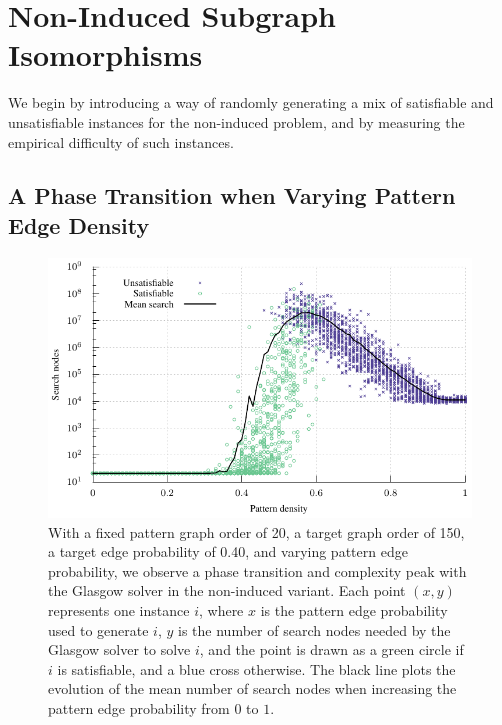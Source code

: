 \documentclass[twoside,11pt]{article}
\begin{document}
\section{Non-Induced Subgraph Isomorphisms}\label{section:non-induced}

We begin by introducing a way of randomly generating a mix of satisfiable and unsatisfiable
instances for the non-induced problem, and by measuring the empirical difficulty of such instances.

\subsection{A Phase Transition when Varying Pattern Edge Density}

\begin{figure}[t]
    \centering
    \includegraphics*{plots/phase-transition.pdf}

    \caption{With a fixed pattern graph order of 20, a target graph order of 150, a target edge
    probability of 0.40, and varying pattern edge probability, we observe a phase transition and
    complexity peak with the Glasgow solver in the non-induced variant. Each point $(x, y)$
    represents one instance $i$, where $x$ is the pattern edge probability used to generate $i$, $y$
    is the number of search nodes needed by the Glasgow solver to solve $i$, and the point is drawn
    as a green circle if $i$ is satisfiable, and a blue cross otherwise. The black line plots the
    evolution of the mean number of search nodes when increasing the pattern edge probability from
    $0$ to $1$.}
    \label{figure:phase-transition}
\end{figure}
\end{document}
